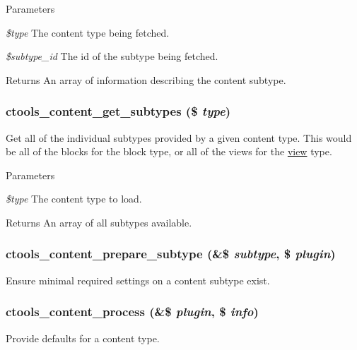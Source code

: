 \begin{DoxyParams}{Parameters}
\item[{\em \$type}]The content type being fetched. \item[{\em \$subtype\_\-id}]The id of the subtype being fetched.\end{DoxyParams}
\begin{DoxyReturn}{Returns}
An array of information describing the content subtype. 
\end{DoxyReturn}
\hypertarget{content_8inc_aebe7b424bae151218c7f2e1670d67b96}{
\subsubsection[{ctools\_\-content\_\-get\_\-subtypes}]{\setlength{\rightskip}{0pt plus 5cm}ctools\_\-content\_\-get\_\-subtypes (\$ {\em type})}}
\label{content_8inc_aebe7b424bae151218c7f2e1670d67b96}
Get all of the individual subtypes provided by a given content type. This would be all of the blocks for the block type, or all of the views for the \hyperlink{classview}{view} type.


\begin{DoxyParams}{Parameters}
\item[{\em \$type}]The content type to load.\end{DoxyParams}
\begin{DoxyReturn}{Returns}
An array of all subtypes available. 
\end{DoxyReturn}
\hypertarget{content_8inc_a7a4b1689ccc9acb74be39fe2de1d35ab}{
\subsubsection[{ctools\_\-content\_\-prepare\_\-subtype}]{\setlength{\rightskip}{0pt plus 5cm}ctools\_\-content\_\-prepare\_\-subtype (\&\$ {\em subtype}, \/  \$ {\em plugin})}}
\label{content_8inc_a7a4b1689ccc9acb74be39fe2de1d35ab}
Ensure minimal required settings on a content subtype exist. \hypertarget{content_8inc_acad481b57f87b650fa0a8cf2b29b6548}{
\subsubsection[{ctools\_\-content\_\-process}]{\setlength{\rightskip}{0pt plus 5cm}ctools\_\-content\_\-process (\&\$ {\em plugin}, \/  \$ {\em info})}}
\label{content_8inc_acad481b57f87b650fa0a8cf2b29b6548}
Provide defaults for a content type.

